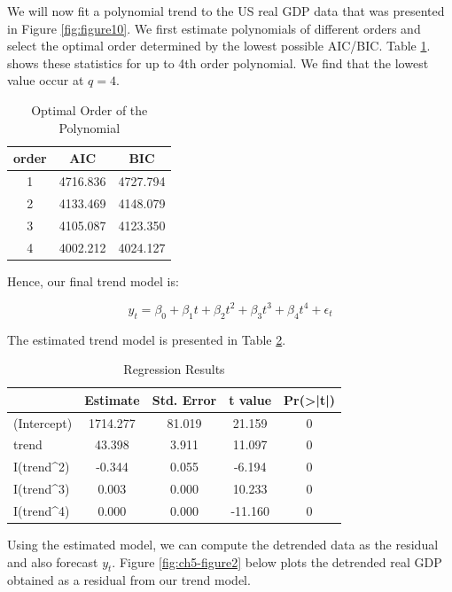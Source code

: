 \documentclass[]{book}
\theoremstyle{definition}
\theoremstyle{definition}
\theoremstyle{definition}
\theoremstyle{remark}
\begin{document}
We will now fit a polynomial trend to the US real GDP data that was
presented in Figure \ref{fig:figure10}. We first estimate polynomials of
different orders and select the optimal order determined by the lowest
possible AIC/BIC. Table \ref{tab:ch5-table1}. shows these statistics for
up to 4th order polynomial. We find that the lowest value occur at
\(q=4\).

\begin{table}

\caption{\label{tab:ch5-table1}Optimal Order of the Polynomial}
\centering
\begin{tabular}[t]{ccc}
\toprule
order & AIC & BIC\\
\midrule
1 & 4716.836 & 4727.794\\
2 & 4133.469 & 4148.079\\
3 & 4105.087 & 4123.350\\
4 & 4002.212 & 4024.127\\
\bottomrule
\end{tabular}
\end{table}

Hence, our final trend model is:

\begin{equation}
y_t=\beta_0 +\beta_1 t + \beta_2 t^2 + \beta_3 t^3 + \beta_4 t^4 +\epsilon_t
\end{equation}

The estimated trend model is presented in Table \ref{tab:ch5-table2}.

\begin{table}

\caption{\label{tab:ch5-table2}Regression Results}
\centering
\begin{tabular}[t]{lcccc}
\toprule
  & Estimate & Std. Error & t value & Pr(>|t|)\\
\midrule
(Intercept) & 1714.277 & 81.019 & 21.159 & 0\\
trend & 43.398 & 3.911 & 11.097 & 0\\
I(trend\textasciicircum{}2) & -0.344 & 0.055 & -6.194 & 0\\
I(trend\textasciicircum{}3) & 0.003 & 0.000 & 10.233 & 0\\
I(trend\textasciicircum{}4) & 0.000 & 0.000 & -11.160 & 0\\
\bottomrule
\end{tabular}
\end{table}

Using the estimated model, we can compute the detrended data as the
residual and also forecast \(y_t\). Figure \ref{fig:ch5-figure2} below
plots the detrended real GDP obtained as a residual from our trend
model.
\end{document}
